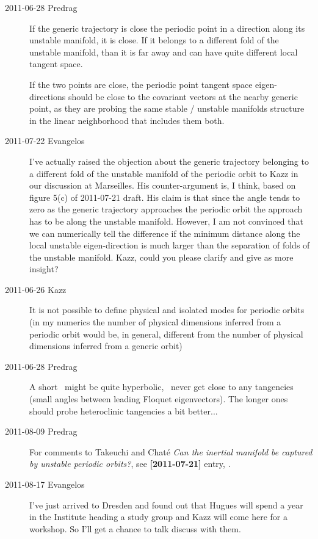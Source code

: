 \begin{description}
\item[2011-06-28 Predrag]
If the generic trajectory is close the periodic point in a direction
along its unstable manifold, it is close. If it belongs to a different fold of the
unstable manifold, than it is far away and can have quite different local
tangent space.

If the two points are close, the periodic point tangent space
eigen-directions should be close to the covariant vectors at the nearby generic
point, as they are probing the same stable / unstable manifolds structure in the
linear neighborhood that includes them both.

\item[2011-07-22 Evangelos]
I've actually raised the objection about the generic trajectory belonging to a
different fold of the unstable manifold of the periodic orbit to Kazz in our
discussion at Marseilles. His
counter-argument is, I think, based on figure 5(c) of 2011-07-21 draft. His
claim is that since the angle tends to zero as the generic trajectory approaches
the periodic orbit the approach has to be along the unstable manifold.
However, I am not convinced that we can numerically tell the difference
if the minimum distance along the local unstable
eigen-direction is much larger than the separation of folds of the unstable
manifold. Kazz, could you please clarify and give as more insight?

\item[2011-06-26 Kazz] It is not possible to
define physical and isolated modes for periodic orbits (in my numerics
the number of physical dimensions inferred from a periodic orbit would
be, in general, different from the number of physical dimensions inferred
from a generic orbit)

\item[2011-06-28 Predrag]
A short \po\ might be quite hyperbolic, \ie\ never get close to any
tangencies (small angles between leading Floquet eigenvectors). The longer ones
should probe heteroclinic tangencies a bit better...

\item[2011-08-09 Predrag] For comments to Takeuchi and Chat\'e
\emph{Can the inertial manifold be captured by unstable periodic
orbits?}, see {\bf [2011-07-21]} entry, .

\item[2011-08-17 Evangelos]
I've just arrived to Dresden and found out that Hugues will
spend a year in the Institute heading a study group and Kazz will come
here for a workshop. So I'll get a chance to talk discuss with them.


\end{description}
